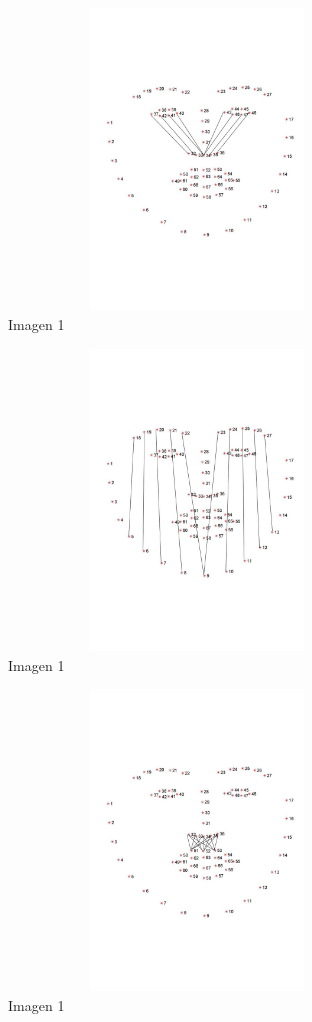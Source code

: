 \documentclass{article}
\begin{document}
\begin{figure}[H]
  \centering
  \includegraphics[width=100mm, height=80mm]{images/cheekbone_distances.jpg}
  \caption{Imagen 1}
\end{figure}


\begin{figure}[H]
  \centering
  \includegraphics[width=100mm, height=80mm]{images/height_distances.jpg}
  \caption{Imagen 1}
\end{figure}


\begin{figure}[H]
  \centering
  \includegraphics[width=100mm, height=80mm]{images/moustache_distances.jpg}
  \caption{Imagen 1}
\end{figure}  
  
\end{document}
